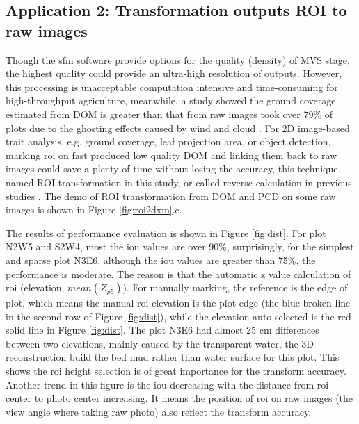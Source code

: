 \documentclass[doublespacing]{configs/bmcart}
\begin{document}
\subsection*{Application 2: Transformation outputs ROI to raw images}
Though the \acrshort*{sfm} software provide options for the quality (density) of MVS stage, the highest quality could provide an ultra-high resolution of outputs. However, this processing is unacceptable computation intensive and time-consuming for high-throughput agriculture, meanwhile, a study showed the ground coverage estimated from DOM is greater than that from raw images took over 79\% of plots due to the ghosting effects caused by wind and cloud \cite{duan_comparison_2017}. For 2D image-based trait analysis, e.g. ground coverage, leaf projection area, or object detection, marking \acrshort*{roi} on fast produced low quality DOM and linking them back to raw images could save a plenty of time without losing the accuracy, this technique named ROI transformation in this study, or called reverse calculation in previous studies \cite{tresch_easympe_2019, duan_comparison_2017}. The demo of ROI transformation from DOM and PCD on some raw images is shown in Figure \ref{fig:roi2dxm}.e.

The results of performance evaluation is shown in Figure \ref{fig:dist}. For plot N2W5 and S2W4, most the \acrshort*{iou} values are over 90\%, surprisingly, for the simplest and sparse plot N3E6, although the \acrshort{iou} values are greater than 75\%, the performance is moderate. The reason is that the automatic z value calculation of \acrshort*{roi} (elevation, $mean(Z_{p5})$). For manually marking, the reference is the edge of plot, which means the manual \acrshort*{roi} elevation is the plot edge (the blue broken line in the second row of Figure \ref{fig:dist}), while the elevation auto-selected is the red solid line in Figure \ref{fig:dist}. The plot N3E6 had almost 25 cm differences between two elevations, mainly caused by the transparent water, the 3D reconstruction build the bed mud rather than water surface for this plot. This shows the \acrshort*{roi} height selection is of great importance for the transform accuracy. Another trend in this figure is the \acrshort*{iou} decreasing with the distance from \acrshort*{roi} center to photo center increasing. It means the position of \acrshort*{roi} on raw images (the view angle where taking raw photo) also reflect the transform accuracy. 
\end{document}
